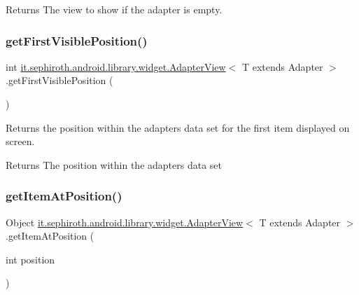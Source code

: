 \begin{DoxyReturn}{Returns}
The view to show if the adapter is empty. 
\end{DoxyReturn}
\mbox{\label{classit_1_1sephiroth_1_1android_1_1library_1_1widget_1_1_adapter_view_a8f6f44a587e3f129705db3f058960bc1}} 
\subsubsection{\texorpdfstring{get\+First\+Visible\+Position()}{getFirstVisiblePosition()}}
{\footnotesize\ttfamily int \hyperlink{classit_1_1sephiroth_1_1android_1_1library_1_1widget_1_1_adapter_view}{it.\+sephiroth.\+android.\+library.\+widget.\+Adapter\+View}$<$ T extends Adapter $>$.get\+First\+Visible\+Position (\begin{DoxyParamCaption}{ }\end{DoxyParamCaption})}

Returns the position within the adapter\textquotesingle{}s data set for the first item displayed on screen.

\begin{DoxyReturn}{Returns}
The position within the adapter\textquotesingle{}s data set 
\end{DoxyReturn}
\mbox{\label{classit_1_1sephiroth_1_1android_1_1library_1_1widget_1_1_adapter_view_ae2abb61ac08e8b2ff882b0e5e4fb314f}} 
\subsubsection{\texorpdfstring{get\+Item\+At\+Position()}{getItemAtPosition()}}
{\footnotesize\ttfamily Object \hyperlink{classit_1_1sephiroth_1_1android_1_1library_1_1widget_1_1_adapter_view}{it.\+sephiroth.\+android.\+library.\+widget.\+Adapter\+View}$<$ T extends Adapter $>$.get\+Item\+At\+Position (\begin{DoxyParamCaption}\item[{int}]{position }\end{DoxyParamCaption})}

